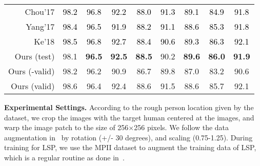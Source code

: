 \documentclass[10pt,journal,compsoc]{IEEEtran}
\begin{document}
\begin{table}[t!]
\begin{tabular}{ r ||c|c|c|c|c|c|c||c }
Chou'17			\textcolor{black}{\cite{chou2017self}\footnotemark[4]}  & \textcolor{black}{{98.2}}& \textcolor{black}{96.8}& \textcolor{black}{92.2}& \textcolor{black}{88.0}& \textcolor{black}{91.3}& \textcolor{black}{89.1}& \textcolor{black}{84.9}&\textcolor{black}{91.8}\\
Yang'17      \textcolor{black}{\cite{yang2017learning}}\footnotemark[5]& \textcolor{black}{98.4}  & \textcolor{black}{96.5}  & \textcolor{black}{91.9}  & \textcolor{black}{88.2}  & \textcolor{black}{91.1}  & \textcolor{black}{88.6}  & \textcolor{black}{85.3} & \textcolor{black}{91.8}\\
Ke'18  \textcolor{black}{\cite{ke2018multi}}\footnotemark[6]& \textcolor{black}{98.5}  & \textcolor{black}{96.8}  & \textcolor{black}{92.7}  & \textcolor{black}{88.4}  & \textcolor{black}{90.6}  & \textcolor{black}{89.3}  & \textcolor{black}{86.3} & \textcolor{black}{92.1}\\


  \hline
  \hline
    Ours (test)\footnotemark[1]& {98.1}& \textbf{96.5}& \textbf{92.5}& \textbf{88.5}& {90.2}& \textbf{89.6}& \textbf{86.0}&\textbf{91.9}\\
    \hline
    Ours (-valid)\footnotemark[2]& {98.2}& {96.2}& {90.9}& {86.7}& {89.8}& {87.0}& {83.2}&{90.6}\\
    Ours (valid)\footnotemark[3]& {98.6}& {96.4}& {92.4}& {88.6}& {91.5}& {88.6}& {85.7}&{92.1}\\
  \hline
 \end{tabular}

\end{table}

\noindent \textbf{Experimental Settings.} According to the rough person location given by the dataset, we crop the images with the target human centered at the images, and warp the image patch to the size of 256$\times$256 pixels. We follow the data augmentation in~\cite{conf/eccv/NewellYD16} by rotation (+/- 30 degrees), and scaling (0.75-1.25). During training for LSP, we use the MPII dataset to augment the training data of LSP, which is a regular routine as done in~\cite{conf/cvpr/WeiRKS16,conf/eccv/InsafutdinovPAA16}.
\end{document}
